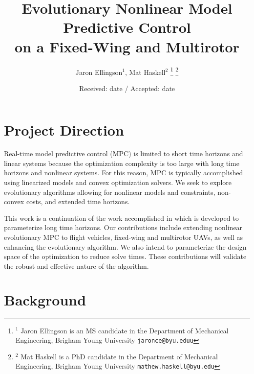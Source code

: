 \documentclass[letterpaper, 10 pt, conference]{ieeeconf}  %
\title{\LARGE \bf
	Evolutionary Nonlinear Model Predictive Control \\ on a Fixed-Wing and Multirotor
}
\author{Jaron Ellingson$^{1}$, Mat Haskell$^{2}$%
	\thanks{$^{1}$ Jaron Ellingson is an MS candidate in the Department of Mechanical Engineering, Brigham Young University
		{\tt\small jaronce@byu.eduu}}%
	\thanks{$^{2}$ Mat Haskell is a PhD candidate in the Department of Mechanical Engineering, Brigham Young University
		{\tt\small mathew.haskell@byu.edu}}%
}
\begin{document}
\maketitle
\thispagestyle{empty}
\pagestyle{empty}

\date{Received: date / Accepted: date}


\maketitle



\section{Project Direction}


Real-time model predictive control (MPC) is limited to short time horizons and linear systems because the optimization complexity is too large with long time horizons and nonlinear systems. For this reason, MPC is typically accomplished using linearized models and convex optimization solvers. We seek to explore evolutionary algorithms allowing for nonlinear models and constraints, non-convex costs, and extended time horizons. 

This work is a continuation of the work accomplished in \cite{hyatt2020parameterized} which is developed to parameterize long time horizons. Our contributions include extending nonlinear evolutionary MPC to flight vehicles, fixed-wing and multirotor UAVs, as well as enhancing the evolutionary algorithm. We also intend to parameterize the design space of the optimization to reduce solve times. These contributions will validate the robust and effective nature of the algorithm.



\section{Background}
\end{document}
